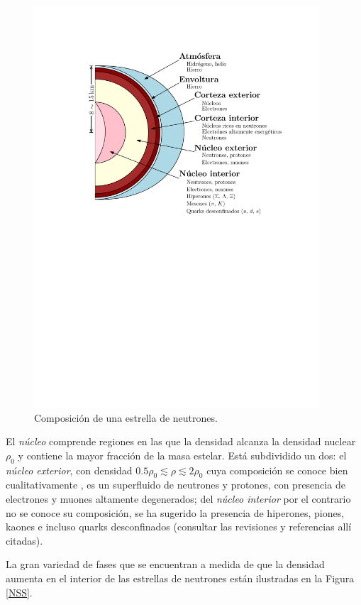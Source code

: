 \begin{figure}[H]
    \centering
    \includegraphics[width=300pt]{figures/neutronstar.pdf}
    \caption{Composición de una estrella de neutrones.\protect\footnotemark}
    \label{NSC}
\end{figure}



El \emph{núcleo} comprende regiones en las que la densidad alcanza la densidad nuclear $\rho_0$ y contiene la mayor fracción de la masa estelar. Está subdividido un dos: el \emph{núcleo exterior}, con densidad $\num{0.5}\rho_0\lesssim\rho\lesssim 2\rho_0$  cuya composición se conoce bien cualitativamente \cite{Haensel2007NeutronStructure}, es un superfluido de neutrones y protones, con presencia de electrones y muones altamente degenerados; del \emph{núcleo interior} por el contrario no se conoce su composición, se ha sugerido la presencia de hiperones, piones, kaones e incluso quarks desconfinados (consultar las revisiones \cite{Lattimer2004,Potekhin} y referencias allí citadas).


La gran variedad de fases que se encuentran a medida de que la densidad aumenta en el interior de las estrellas de neutrones están ilustradas en la Figura \ref{NSS}.     

